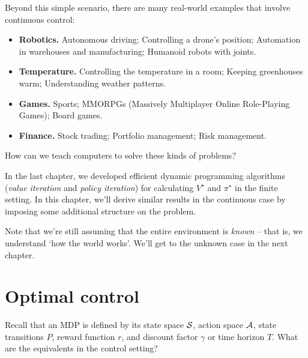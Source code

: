 \documentclass[../main/main]{subfiles}
\begin{document}
Beyond this simple scenario, there are many real-world examples that involve continuous control:
\begin{itemize}
    \item \textbf{Robotics.} Autonomous driving; Controlling a drone's position; Automation in warehouses and manufacturing; Humanoid robots with joints.
    \item \textbf{Temperature.} Controlling the temperature in a room; Keeping greenhouses warm; Understanding weather patterns.
    \item \textbf{Games.} Sports; MMORPGs (Massively Multiplayer Online Role-Playing Games); Board games.
    \item \textbf{Finance.} Stock trading; Portfolio management; Risk management.
\end{itemize}
How can we teach computers to solve these kinds of problems?

In the last chapter, we developed efficient dynamic programming algorithms (\emph{value iteration} and \emph{policy iteration})
for calculating $V^\star$ and $\pi^\star$ in the finite setting.
In this chapter, we'll derive similar results in the continuous case by imposing
some additional structure on the problem.

Note that we're still assuming that the entire environment is \emph{known} --
that is, we understand `how the world works'. We'll get to the unknown case in the next chapter.

\section{Optimal control}

Recall that an MDP is defined by its state space $\S$, action space $\A$, state transitions $P$, reward function $r$, and discount factor $\gamma$ or time horizon $T$. What are the equivalents in the control setting?
\end{document}
